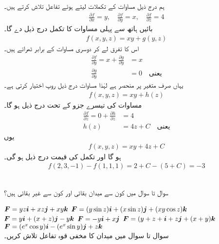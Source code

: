 ہم درج ذیل مساوات کے تکملات لیتے ہوئے تفاعل  تلاش کرتے ہیں۔
\begin{align}\label{مساوات_سمتی_تکمل_مثال_قطعی_تفرقی_الف}
\frac{\partial f}{\partial x}=y,\quad \frac{\partial f}{\partial y}=x,\quad \frac{\partial f}{\partial z}=4
\end{align}
بائیں ہاتھ سے پہلی مساوات کا تکمل درج ذیل دے گا۔
\begin{align}\label{مساوات_سمتی_تکمل_مثال_قطعی_تفرقی_ب}
f(x,y,z)=xy+g(y,z)
\end{align}
اس کا  تفرق لے کر دوسری مساوات کے برابر ٹھراتے ہیں۔
\begin{align*}
\frac{\partial f}{\partial y}=x+\frac{\partial g}{\partial y}&=x\\
\frac{\partial g}{\partial y}&=0\quad \text{یعنی}
\end{align*}
یہاں  صرف متغیر  پر منحصر ہے لہٰذا مساوات  درج ذیل روپ اختیار کرتی ہے۔
\begin{align}
f(x,y,z)=xy+h(z)
\end{align}
مساوات  کی تیسرے جزو کے تحت درج ذیل ہو گا۔
\begin{align*}
\frac{\partial f}{\partial z}=0+\frac{\partial h}{\partial z}&=4\\
h(z)&=4z+C\quad \text{یعنی}
\end{align*}
یوں
\begin{align*}
f(x,y,z)=xy+4z+C
\end{align*}
ہو گا اور تکمل کی قیمت درج ذیل ہو گی۔
\begin{align*}
f(2,3,-1)-f(1,1,1)=2+C-(5+C)=-3
\end{align*}

\\
سوال  تا سوال  میں کون سے میدان بقائی اور کون سے غیر بقائی ہیں؟

\({{\boldsymbol{F}}}=yz{\boldsymbol{i}}+xz{\boldsymbol{j}}+xy{\boldsymbol{k}}\)
\({{\boldsymbol{F}}}=(y\sin z){\boldsymbol{i}}+(x\sin z){\boldsymbol{j}}+(xy\cos z){\boldsymbol{k}}\)
\({{\boldsymbol{F}}}=y{\boldsymbol{i}}+(x+z){\boldsymbol{j}}-y{\boldsymbol{k}}\)
\({{\boldsymbol{F}}}=-y{\boldsymbol{i}}+x{\boldsymbol{j}}\)
\({{\boldsymbol{F}}}=(y+z+{\boldsymbol{i}}+z{\boldsymbol{j}}+(x+y){\boldsymbol{k}}\)
\({{\boldsymbol{F}}}=(e^x \cos y){\boldsymbol{i}}-(e^x\sin y){\boldsymbol{j}}+z{\boldsymbol{k}}\)
\\
سوال  تا سوال  میں میدان  کا مخفی قوہ تفاعل  تلاش کریں۔

